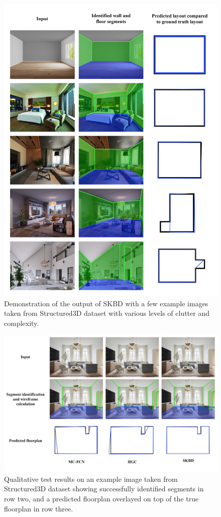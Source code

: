 \begin{figure}[htbp]
\centering
\includegraphics[width=0.9\linewidth]{images/results2.png}
\caption{\label{fig:resultlayouts}Demonstration of the output of SKBD with a few example images taken from Structured3D dataset\cite{zheng2020structured3d} with various levels of clutter and complexity.}
\end{figure}

\begin{figure}[htbp]
\centering
\includegraphics[width=0.9\linewidth]{images/comparison_test_images.png}
\caption{\label{fig:comparisontest}Qualitative test results on an example image taken from Structured3D dataset\cite{zheng2020structured3d} showing successfully identified segments in row two, and a predicted floorplan overlayed on top of the true floorplan in row three.}
\end{figure}

